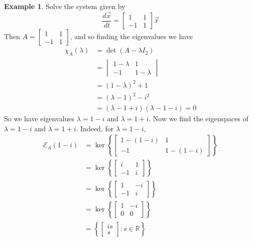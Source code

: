 \documentclass[11pt]{article}
\theoremstyle{definition}\newtheorem{definition}{Definition}
\theoremstyle{definition}\newtheorem{notation}{Notation}
\theoremstyle{definition}\newtheorem{example}{Example}
\theoremstyle{theorem}\newtheorem{theorem}{Theorem}
\theoremstyle{theorem}\newtheorem{corollary}{Corollary}
\theoremstyle{theorem}\newtheorem{proposition}{Proposition}
\theoremstyle{theorem}\newtheorem{lemma}{Lemma}
\theoremstyle{theorem}\newtheorem{question}{Question}
\theoremstyle{remark}\newtheorem{remark}{Remark}
\newcommand{\R}{\mathbb{R}}
\newcommand{\E}{\mathcal{E}}
\begin{document}
\begin{example}
    Solve the system given by
    \begin{equation*}
        \frac{d\vec{x}}{dt} = \begin{bmatrix} 1 & 1 \\ -1 & 1 \end{bmatrix} \vec{x}
    \end{equation*}
    Then $A = \begin{bmatrix} 1 & 1 \\ -1 & 1 \end{bmatrix}$, and so finding the eigenvalues we have
    \begin{align*}
        \chi_A(\lambda) &= \det(A - \lambda I_2) \\
        &= \begin{vmatrix} 1 - \lambda & 1 \\ -1 & 1 - \lambda \end{vmatrix} \\
        &= (1 - \lambda)^2 + 1 \\
        &= (\lambda - 1)^2 - i^2 \\
        &= (\lambda - 1 + i)(\lambda - 1 - i) = 0
    \end{align*}
    So we have eigenvalues $\lambda = 1 - i$ and $\lambda = 1 + i$. Now we find the eigenspaces of $\lambda = 1 - i$ and $\lambda = 1 + i$. Indeed, for $\lambda = 1 - i$,
    \begin{align*}
        \E_A(1 - i) &= \ker\left\{\begin{bmatrix} 1 - (1 - i) & 1 \\ -1 & 1 - (1 - i) \end{bmatrix}\right\} \\
        &= \ker\left\{\begin{bmatrix} i & 1 \\ -1 & i \end{bmatrix}\right\} \\
        &= \ker\left\{\begin{bmatrix} 1 & -i \\ -1 & i \end{bmatrix}\right\} \\
        &= \ker\left\{\begin{bmatrix} 1 & -i \\ 0 & 0 \end{bmatrix}\right\} \\
        &= \left\{\begin{bmatrix} is \\ s \end{bmatrix} : s \in \R\right\} \\

\end{align*}
\end{example}
\end{document}

